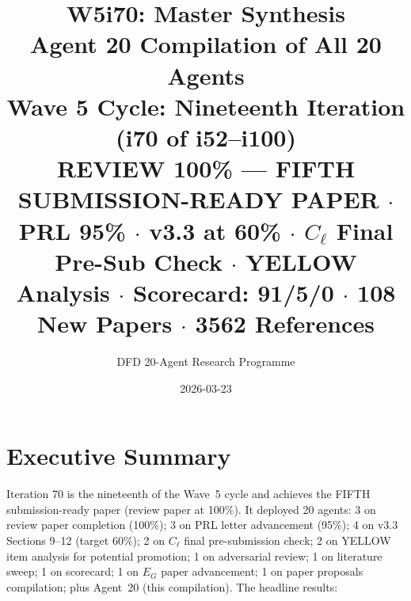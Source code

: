 \documentclass[11pt,a4paper]{article}
\title{\Huge W5i70: Master Synthesis\\[12pt]
\Large Agent 20 Compilation of All 20 Agents\\[6pt]
\large Wave 5 Cycle: Nineteenth Iteration (i70 of i52--i100)\\[6pt]
\normalsize \textbf{REVIEW 100\% --- FIFTH SUBMISSION-READY PAPER} $\cdot$ PRL 95\% $\cdot$ v3.3 at 60\% $\cdot$ $C_\ell$ Final Pre-Sub Check $\cdot$ YELLOW Analysis $\cdot$ Scorecard: 91/5/0 $\cdot$ 108 New Papers $\cdot$ 3562 References}
\author{DFD 20-Agent Research Programme}
\date{2026-03-23}
\begin{document}
\maketitle


\section{Executive Summary}

Iteration 70 is the nineteenth of the Wave~5 cycle and achieves the FIFTH submission-ready paper (review paper at 100\%). It deployed 20 agents: 3 on review paper completion (100\%); 3 on PRL letter advancement (95\%); 4 on v3.3 Sections 9--12 (target 60\%); 2 on $C_\ell$ final pre-submission check; 2 on YELLOW item analysis for potential promotion; 1 on adversarial review; 1 on literature sweep; 1 on scorecard; 1 on $E_G$ paper advancement; 1 on paper proposals compilation; plus Agent~20 (this compilation). The headline results:
\end{document}

